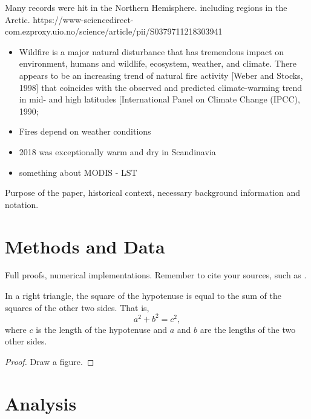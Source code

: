 \documentclass[a4paper, article, oneside, UKenglish]{memoir}
\newcommand{\0}{\mathbf{0}}
\newcommand{\1}{\mathbf{1}}
\begin{document}
Many records were hit in the Northern Hemisphere.
including regions in the Arctic. 
https://www-sciencedirect-com.ezproxy.uio.no/science/article/pii/S0379711218303941

\begin{itemize}
    \item  Wildfire is a major natural disturbance that has
tremendous impact on environment, humans and wildlife,
ecosystem, weather, and climate. There appears to be an
increasing trend of natural fire activity [Weber and Stocks,
1998] that coincides with the observed and predicted
climate-warming trend in mid- and high latitudes [International Panel on Climate Change (IPCC), 1990;
    \item Fires depend on weather conditions
    \item 2018 was exceptionally warm and dry in Scandinavia
    \item something about MODIS - LST
\end{itemize}

Purpose of the paper, historical context, necessary background information and notation.

\chapter{Methods and Data}


Full proofs, numerical implementations.
Remember to cite your sources,
such as \cite{Hel17}.

\begin{theorem}[Pythagoras]
    \label{thm:pythagoras}
    In a right triangle,
    the square of the hypotenuse is equal to the sum of the squares of the other two sides.
    That is,
    \begin{equation}
        \label{eq:pythagoras}
            a^2 + b^2 = c^2,
    \end{equation}
    where \(c\) is the length of the hypotenuse and \(a\) and \(b\) are the lengths of the two other sides.
\end{theorem}

\begin{proof}
    Draw a figure.
\end{proof}

\chapter{Analysis}
\end{document}
